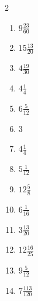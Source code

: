 \documentclass[12pt]{article}
\begin{document}
\begin{multicols}{2}
\begin{enumerate}
\item $ 9 \frac{23}{60} $
\item $ 15 \frac{13}{20} $
\item $ 4 \frac{19}{30} $
\item $ 4 \frac{1}{4} $
\item $ 6 \frac{5}{12} $
\item $ 3 $
\item $ 4 \frac{1}{4} $
\item $ 5 \frac{1}{12} $
\item $ 12 \frac{5}{8} $
\item $ 6 \frac{1}{16} $
\item $ 3 \frac{13}{20} $
\item $ 12 \frac{16}{25} $
\item $ 9 \frac{5}{12} $
\item $ 7 \frac{113}{120} $
\end{enumerate}\end{multicols}\newpage
\end{document}
